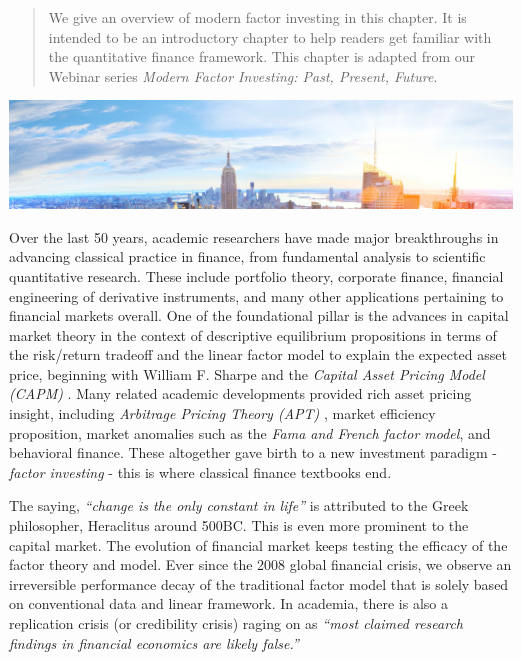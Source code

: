 \documentclass[
]{book}
\begin{document}
\begin{quote}
We give an overview of modern factor investing in this chapter. It is intended to be an introductory chapter to help readers get familiar with the quantitative finance framework. This chapter is adapted from our Webinar series {\emph{Modern Factor Investing: Past, Present, Future}}.
\end{quote}

\includegraphics[width=1\linewidth]{images/chapter3/nyc}

Over the last 50 years, academic researchers have made major breakthroughs in advancing classical practice in finance, from fundamental analysis to scientific quantitative research. These include portfolio theory, corporate finance, financial engineering of derivative instruments, and many other applications pertaining to financial markets overall. One of the foundational pillar is the advances in capital market theory in the context of descriptive equilibrium propositions in terms of the risk/return tradeoff and the linear factor model to explain the expected asset price, beginning with William F. Sharpe and the {\emph{Capital Asset Pricing Model (CAPM)}} \citep{sharpe1964capital}. Many related academic developments provided rich asset pricing insight, including {\emph{Arbitrage Pricing Theory (APT)}} \citep{ross1976arbitrage}, market efficiency proposition, market anomalies such as the {\emph{Fama and French factor model}}, and behavioral finance. These altogether gave birth to a new investment paradigm - {\emph{factor investing}} - this is where classical finance textbooks end.

The saying, \emph{``change is the only constant in life''} is attributed to the Greek philosopher, Heraclitus around 500BC. This is even more prominent to the capital market. The evolution of financial market keeps testing the efficacy of the factor theory and model. Ever since the 2008 global financial crisis, we observe an irreversible performance decay of the traditional factor model that is solely based on conventional data and linear framework. In academia, there is also a replication crisis (or credibility crisis) raging on as \emph{``most claimed research findings in financial economics are likely false.''} \citep{harvey2016and}
\end{document}
